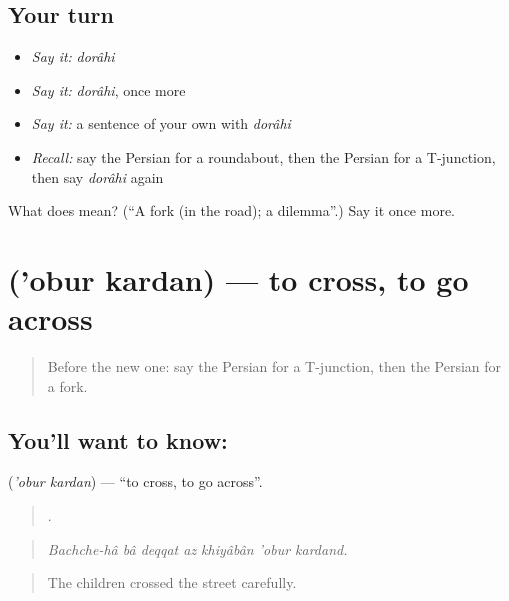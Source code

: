 \subsection*{Your turn}
\begin{itemize}
\raggedright
  \item \emph{Say it:} \emph{dorâhi}
  \item \emph{Say it:} \emph{dorâhi}, once more
  \item \emph{Say it:} a sentence of your own with \emph{dorâhi}
  \item \emph{Recall:} say the Persian for a roundabout, then the Persian for a T-junction, then say \emph{dorâhi} again
\end{itemize}

\begin{tcolorbox}[breakable,colback=teal!4,colframe=teal!35!black,title={Before you move on}]
What does  mean? (\textquotedblleft{}A fork (in the road); a dilemma\textquotedblright{}.) Say it once more.
\end{tcolorbox}
\section[\texorpdfstring{\fa{عبور} \fa{کردن} ('obur kardan)}{عبور کردن ('obur kardan)}]{  ('obur kardan) — to cross, to go across}

\label{lesson:FA-C445-obur-kardan}



\begin{quote}
Before the new one: say the Persian for a T-junction, then the Persian for a fork.
\end{quote}

\subsection*{You'll want to know:  }
\textbf{ } (\emph{'obur kardan}) — \textquotedblleft{}to cross, to go across\textquotedblright{}.

\begin{quote}
       .
\end{quote}

\begin{quote}
\emph{Bachche-hâ bâ deqqat az khiyâbân 'obur kardand.}
\end{quote}

\begin{quote}
The children crossed the street carefully.
\end{quote}

